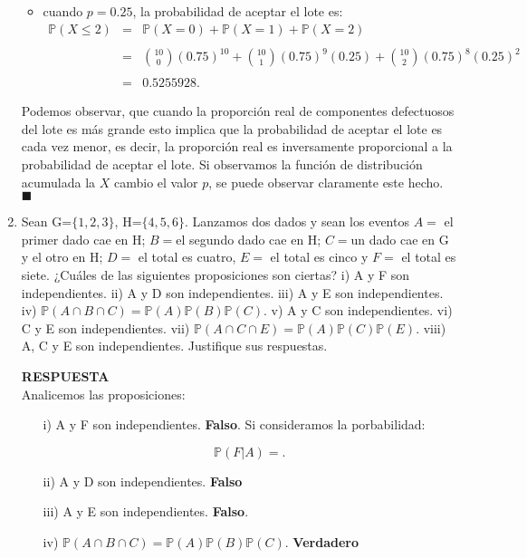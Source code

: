 \documentclass[11pt,letterpaper]{article}
\newcommand{\mP}{\mathbb{P}}
\newcommand{\res}{\textbf{RESPUESTA}\\}
\begin{document}
\begin{enumerate}
\begin{itemize}
\item cuando $p=0.25$, la probabilidad de aceptar el lote es: 
\begin{equation*}
\begin{array}{ccl}
\mP(X\leq 2)&=&\mP(X=0)+\mP(X=1)+\mP(X=2)\\
&& \\
&=&{10\choose0}(0.75)^{10}+{10\choose1}(0.75)^9(0.25)+{10\choose2}(0.75)^8(0.25)^2\\
&& \\
&=& 0.5255928.
\end{array}
\end{equation*}
\end{itemize}

Podemos observar, que cuando la proporción real de componentes defectuosos del lote es más grande esto implica que la probabilidad de aceptar el lote es cada vez menor, es decir, la proporción real es inversamente proporcional a la probabilidad de aceptar el lote. Si observamos la función de distribución acumulada la $X$ cambio el valor $p$, se puede observar claramente este hecho. $\blacksquare$


\item Sean G=$\{1, 2, 3\}$, H=$\{4, 5, 6\}$. Lanzamos dos dados y sean los eventos $A=$ el primer dado cae en H; $B=$el segundo dado cae en H; $C=$un dado cae en G y el otro en H; $D=$ el total es cuatro, $E=$ el total es cinco y $F=$ el total es siete. ¿Cuáles de las siguientes proposiciones son ciertas? i) A y F son independientes. ii) A y D son independientes. iii) A
y E son independientes. iv) $\mP(A \cap B \cap C) = \mP (A)\mP (B)\mP (C)$. v) A y C son independientes.
vi) C y E son independientes. vii) $\mP (A \cap C \cap E) = \mP (A)\mP (C)\mP (E)$. viii) A, C y E son
independientes. Justifique sus respuestas.

\res
Analicemos las proposiciones:
\begin{itemize}
\item[i)] A y F son independientes. \textbf{Falso}. Si consideramos la porbabilidad: 

$$\mP(F|A)=.$$


\item[ii)] A y D son independientes. \textbf{Falso}

\item[iii)] A y E son independientes. \textbf{Falso}.

\item[iv)] $\mP(A \cap B \cap C) = \mP (A)\mP (B)\mP (C)$. \textbf{Verdadero}


\end{itemize}
\end{enumerate}
\end{document}
